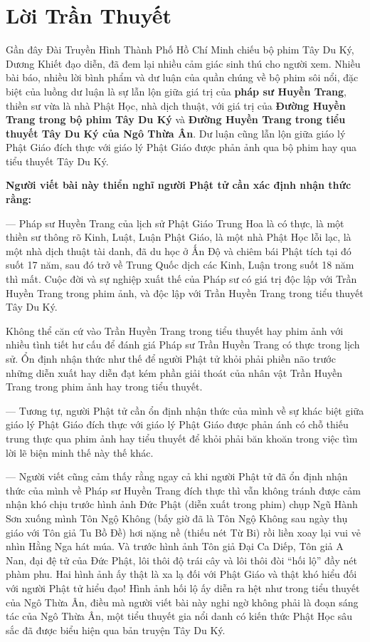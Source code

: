 \chapter{Lời Trần Thuyết} %
\label{cha:loi_tran_thuyet}

Gần đây Đài Truyền Hình Thành Phố Hồ Chí Minh chiếu bộ phim Tây Du Ký, Dương Khiết đạo diễn, đã đem lại nhiều cảm giác sinh thú cho người xem. Nhiều bài báo, nhiều lời bình phẩm và dư luận của quần chúng về bộ phim sôi nổi, đặc biệt của luồng dư luận là sự lẫn lộn giữa giá trị của {\bf pháp sư Huyền Trang}, thiền sư vừa là nhà Phật Học, nhà dịch thuật, với giá trị của {\bf Đường Huyền Trang trong bộ phim Tây Du Ký} và {\bf Đường Huyền Trang trong tiểu thuyết Tây Du Ký của Ngô Thừa Ân}. Dư luận cũng lẫn lộn giữa giáo lý Phật Giáo đích thực với giáo lý Phật Giáo được phản ảnh qua bộ phim hay qua tiểu thuyết Tây Du Ký.

{\bf Người viết bài này thiển nghĩ người Phật tử cần xác định nhận thức rằng:}

--- Pháp sư Huyền Trang của lịch sử Phật Giáo Trung Hoa là có thực, là một thiền sư thông rõ Kinh, Luật, Luận Phật Giáo, là một nhà Phật Học lỗi lạc, là một nhà dịch thuật tài danh, đã du học ở Ấn Độ và chiêm bái Phật tích tại đó suốt 17 năm, sau đó trở về Trung Quốc dịch các Kinh, Luận trong suốt 18 năm thì mất. Cuộc đời và sự nghiệp xuất thế của Pháp sư có giá trị độc lập với Trần Huyền Trang trong phim ảnh, và độc lập với Trần Huyền Trang trong tiểu thuyết Tây Du Ký.

Không thể căn cứ vào Trần Huyền Trang trong tiểu thuyết hay phim ảnh với nhiều tình tiết hư cấu để đánh giá Pháp sư Trần Huyền Trang có thực trong lịch sử. Ổn định nhận thức như thế để người Phật tử khỏi phải phiền não trước những diễn xuất hay diễn đạt kém phần giải thoát của nhân vật Trần Huyền Trang trong phim ảnh hay trong tiểu thuyết.

--- Tương tự, người Phật tử cần ổn định nhận thức của mình về sự khác biệt giữa giáo lý Phật Giáo đích thực với giáo lý Phật Giáo được phản ánh có chỗ thiếu trung thực qua phim ảnh hay tiểu thuyết để khỏi phải băn khoăn trong việc tìm lời lẽ biện minh thế này thế khác.

--- Người viết cũng cảm thấy rằng ngay cả khi người Phật tử đã ổn định nhận thức của mình về Pháp sư Huyền Trang đích thực thì vẫn không tránh được cảm nhận khó chịu trước hình ảnh Đức Phật (diễn xuất trong phim) chụp Ngũ Hành Sơn xuống mình Tôn Ngộ Không (bấy giờ đã là Tôn Ngộ Không sau ngày thụ giáo với Tôn giả Tu Bồ Đề) hơi nặng nề (thiếu nét Từ Bi) rồi liền xoay lại vui vẻ nhìn Hằng Nga hát múa. Và trước hình ảnh Tôn giả Đại Ca Diếp, Tôn giả A Nan, đại đệ tử của Đức Phật, lôi thôi độ trái cây và lôi thôi đòi ``hối lộ'' đầy nét phàm phu. Hai hình ảnh ấy thật là xa lạ đối với Phật Giáo và thật khó hiểu đối với người Phật tử hiểu đạo! Hình ảnh hối lộ ấy diễn ra hệt như trong tiểu thuyết của Ngô Thừa Ân, điều mà người viết bài này nghi ngờ không phải là đoạn sáng tác của Ngô Thừa Ân, một tiểu thuyết gia nổi danh có kiến thức Phật Học sâu sắc đã được biểu hiện qua bản truyện Tây Du Ký.


